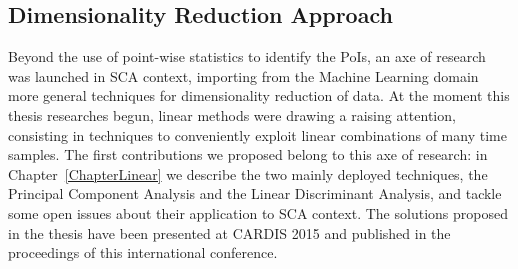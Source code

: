 \subsection{Dimensionality Reduction Approach}\label{sec:dim_red_objective}
Beyond the use of point-wise statistics to identify the PoIs, an axe of research was launched in SCA context, importing from the Machine Learning domain more general techniques for dimensionality reduction of data. At the moment this thesis researches begun, linear methods were drawing a raising attention, consisting in techniques to conveniently exploit linear combinations of many time samples. The first contributions we proposed belong to this axe of research: in Chapter~\ref{ChapterLinear} we describe the two mainly deployed techniques, the Principal Component Analysis and the Linear Discriminant Analysis, and tackle some open issues about their application to SCA context. The solutions proposed in the thesis have been presented at CARDIS 2015 \cite{cagli2015enhancing} and published in the proceedings of this international conference.\\

